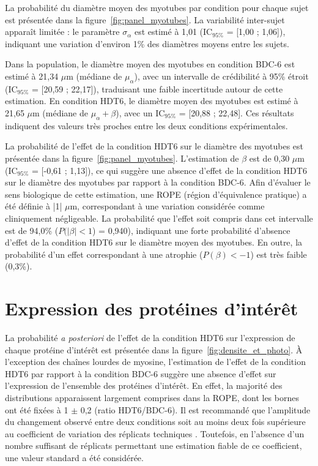 \documentclass[11pt]{report}
\begin{document}
La probabilité du diamètre moyen des myotubes par condition pour chaque sujet est présentée dans la figure~\ref{fig:panel_myotubes}. La variabilité inter-sujet apparaît limitée : le paramètre $\sigma_{\alpha}$ est estimé à 1,01 (IC$_{95\%}$ = [1,00 ; 1,06]), indiquant une variation d'environ 1\% des diamètres moyens entre les sujets.

Dans la population, le diamètre moyen des myotubes en condition BDC-6 est estimé à 21,34 $\mu$m (médiane de $\mu_{\alpha}$), avec un intervalle de crédibilité à 95\% étroit (IC$_{95\%}$ = [20,59 ; 22,17]), traduisant une faible incertitude autour de cette estimation. En condition HDT6, le diamètre moyen des myotubes est estimé à 21,65 $\mu$m (médiane de $\mu_{\alpha} + \beta$), avec un IC$_{95\%}$ = [20,88 ; 22,48]. Ces résultats indiquent des valeurs très proches entre les deux conditions expérimentales.

\medskip La probabilité de l'effet de la condition HDT6 sur le diamètre des myotubes est présentée dans la figure~\ref{fig:panel_myotubes}. L'estimation de $\beta$ est de 0,30 $\mu$m (IC$_{95\%}$ = [-0,61 ; 1,13]), ce qui suggère une absence d'effet de la condition HDT6 sur le diamètre des myotubes par rapport à la condition BDC-6. Afin d'évaluer le sens biologique de cette estimation, une ROPE (région d'équivalence pratique) a été définie à |1| $\mu$m, correspondant à une variation considérée comme cliniquement négligeable. La probabilité que l'effet soit compris dans cet intervalle est de 94,0\% ($P(|\beta|<1$) = 0,940), indiquant une forte probabilité d'absence d'effet de la condition HDT6 sur le diamètre moyen des myotubes. En outre, la probabilité d'un effet correspondant à une atrophie ($P(\beta)<-1$) est très faible (0,3\%).

\section{Expression des protéines d'intérêt}

La probabilité \textit{a posteriori} de l'effet de la condition HDT6 sur l'expression de chaque protéine d'intérêt est présentée dans la figure~\ref{fig:densite_et_photo}. À l'exception des chaînes lourdes de myosine, l'estimation de l'effet de la condition HDT6 par rapport à la condition BDC-6 suggère une absence d'effet sur l'expression de l'ensemble des protéines d'intérêt. En effet, la majorité des distributions apparaissent largement comprises dans la ROPE, dont les bornes ont été fixées à 1 $\pm$ 0,2 (ratio HDT6/BDC-6). Il est recommandé que l'amplitude du changement observé entre deux conditions soit au moins deux fois supérieure au coefficient de variation des réplicats techniques \parencite{BibEntry2026Apr}. Toutefois, en l'absence d'un nombre suffisant de réplicats permettant une estimation fiable de ce coefficient, une valeur standard a été considérée.
\end{document}
